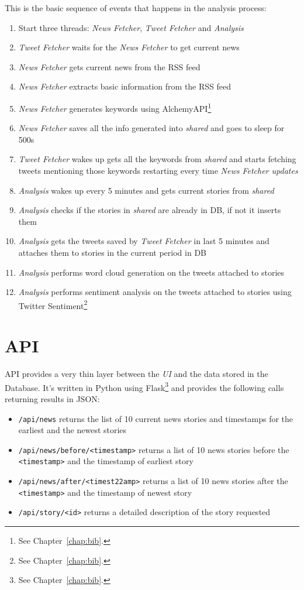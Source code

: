 \documentclass{report}
\begin{document}
	This is the basic sequence of events that happens in the analysis process:
		\begin{enumerate}
		  \item Start three threads: \emph{News Fetcher}, \emph{Tweet Fetcher} and \emph{Analysis}
		  \item \emph{Tweet Fetcher} waits for the \emph{News Fetcher} to get current news
		  \item \emph{News Fetcher} gets current news from the RSS feed
		  \item \emph{News Fetcher} extracts basic information from the RSS feed
		  \item \emph{News Fetcher} generates keywords using AlchemyAPI\footnote{See Chapter~\ref{chap:bib}.}
		  \item \emph{News Fetcher} saves all the info generated into \emph{shared} and goes to sleep for 500s
		  \item \emph{Tweet Fetcher} wakes up gets all the keywords from \emph{shared} and starts fetching tweets mentioning those keywords restarting every time \emph{News Fetcher updates}
		  \item \emph{Analysis} wakes up every 5 minutes and gets current stories from \emph{shared}
		  \item \emph{Analysis} checks if the stories in \emph{shared} are already in DB, if not it inserts them
		  \item \emph{Analysis} gets the tweets saved by \emph{Tweet Fetcher} in last 5 minutes and attaches them to stories in the current period in DB
		  \item \emph{Analysis} performs word cloud generation on the tweets attached to stories
		  \item \emph{Analysis} performs sentiment analysis on the tweets attached to stories using Twitter Sentiment\footnote{See Chapter~\ref{chap:bib}.}
		\end{enumerate}
		
		\section{API}
		API provides a very thin layer between the \emph{UI} and the data stored in the Database. It's written in Python using Flask\footnote{See Chapter~\ref{chap:bib}.} and provides the following calls returning results in JSON:
		\begin{itemize}
		  \item \verb|/api/news| returns the list of 10 current news stories and timestamps for the earliest and the newest stories
		  \item \verb|/api/news/before/<timestamp>| returns a list of 10 news stories before the \verb|<timestamp>| and the timestamp of earliest story
		  \item \verb|/api/news/after/<timest22amp>| returns a list of 10 news stories after the \verb|<timestamp>| and the timestamp of newest story
		  \item \verb|/api/story/<id>| returns a detailed description of the story requested
		\end{itemize}
		
\end{document}
